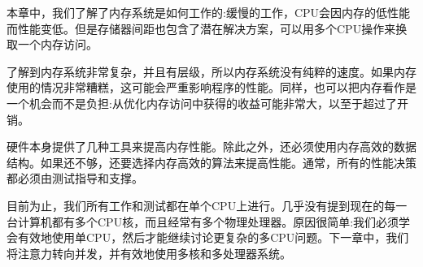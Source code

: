 本章中，我们了解了内存系统是如何工作的:缓慢的工作，CPU会因内存的低性能而性能变低。但是存储器间距也包含了潜在解决方案，可以用多个CPU操作来换取一个内存访问。

了解到内存系统非常复杂，并且有层级，所以内存系统没有纯粹的速度。如果内存使用的情况非常糟糕，这可能会严重影响程序的性能。同样，也可以把内存看作是一个机会而不是负担:从优化内存访问中获得的收益可能非常大，以至于超过了开销。

硬件本身提供了几种工具来提高内存性能。除此之外，还必须使用内存高效的数据结构。如果还不够，还要选择内存高效的算法来提高性能。通常，所有的性能决策都必须由测试指导和支撑。

目前为止，我们所有工作和测试都在单个CPU上进行。几乎没有提到现在的每一台计算机都有多个CPU核，而且经常有多个物理处理器。原因很简单:我们必须学会有效地使用单CPU，然后才能继续讨论更复杂的多CPU问题。下一章中，我们将注意力转向并发，并有效地使用多核和多处理器系统。